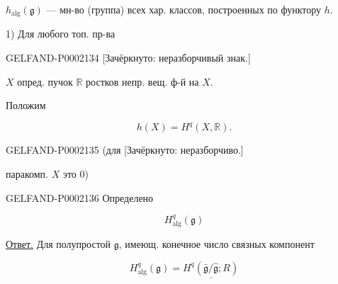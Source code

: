 $h_{\mathrm{alg}}(\mathfrak g)$ --- мн-во (группа) всех хар. классов, построенных по функтору $h$.



1) Для любого топ. пр-ва



\begin{GelfandAdjacentEvidence}{GELFAND-P000213}{4}
[Зачёркнуто: неразборчивый знак.]
\end{GelfandAdjacentEvidence}

$X$ опред. пучок $\mathbb R$ ростков непр. вещ. ф-й на $X$.



Положим



\begin{equation*}h(X)=H^q(X,\mathbb R).\end{equation*}



\begin{GelfandAdjacentEvidence}{GELFAND-P000213}{5}
(для [Зачёркнуто: неразборчиво.]
\end{GelfandAdjacentEvidence}

паракомп. $X$ это $0$)



\begin{GelfandAdjacentEvidence}{GELFAND-P000213}{6}
Определено



\begin{equation*}H_{\mathrm{alg}}^q(\mathfrak g)\end{equation*}



\underline{\underline{Ответ.}} Для полупростой $\mathfrak g$, имеющ. конечное число связных компонент



\begin{equation*}H_{\mathrm{alg}}^q(\mathfrak g)=\underline{H^q(\bar{\mathfrak g}/\hat{\mathfrak g};R)}\end{equation*}
\end{GelfandAdjacentEvidence}

